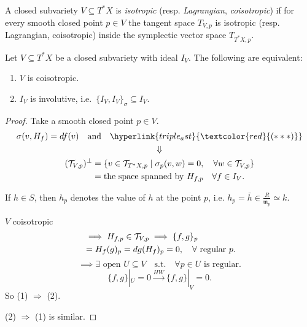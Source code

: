 \begin{definition}[Def.~8.4]
    A closed subvariety $V\subseteq T^\ast X$ is \emph{isotropic} (resp.
    \emph{Lagrangian}, \emph{coisotropic}) if for every smooth closed point
    $p\in V$ the tangent space $T_{V,p}$ is isotropic (resp. Lagrangian,
    coisotropic) inside the symplectic vector space $T_{T^\ast X,p}$.
\end{definition}

\begin{theorem}[Thm.~8.5]
    Let $V\subseteq T^\ast X$ be a closed subvariety with ideal $I_V$.  The
    following are equivalent:
    \begin{enumerate}
        \item $V$ is coisotropic.
        \item $I_V$ is involutive, i.e.\ $\{I_V,I_V\}_\sigma\subseteq I_V$.
    \end{enumerate}
\end{theorem}
\begin{proof}
    Take a smooth closed point $p \in V$.
    \begin{gather*}
        \sigma(v, H_f) = df(v) \quad \text{and} \quad \hyperlink{triple_ast}{\textcolor{red}{(* * *)}} \\
        \Downarrow \\ %
        \begin{align*}
            (\Tv_{V,p})^\perp & = \{ v \in \Tv_{T^*X, p} \mid \sigma_p(v, w) = 0, \quad \forall w \in \Tv_{V,p} \} \\
                              & = \text{the space spanned by } H_{f,p} \quad \forall f \in I_V.
        \end{align*}
    \end{gather*}

    \noindent If $h \in S$, then $h_p$ denotes the value of $h$ at the point $p$, i.e. $h_p = \bar{h} \in \frac{R}{\mathfrak{m}_p} \simeq k$.


    \vspace{1em}

    \noindent $V$ coisotropic
    \begin{align*}
         & \implies H_{f,p} \in \mathcal{T}_{V,p} \implies \{f, g\}_p            \\
         & = H_f(g)_p = dg(H_f)_p = 0, \quad \forall \text{ regular } p.
    \end{align*}
    \[
        \implies \exists \text{ open } U \subseteq V \quad \text{s.t.} \quad \forall p \in U \text{ is regular.}
    \]
    \[
        \{f, g\}|_U = 0 \xrightarrow{HW} \{f, g\}|_V = 0.
    \]
    So (1) $\Rightarrow$ (2).

    \vspace{1em}
    \noindent (2) $\Rightarrow$ (1) is similar.
\end{proof}

